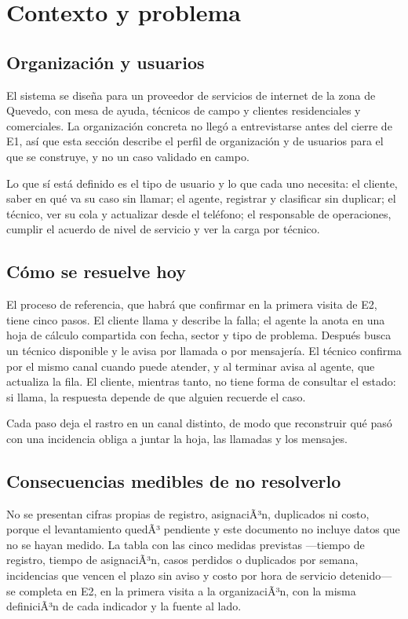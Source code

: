 \section{Contexto y problema}

\subsection{Organización y usuarios}

El sistema se diseña para un proveedor de servicios de internet de la zona de Quevedo, con mesa de
ayuda, técnicos de campo y clientes residenciales y comerciales. La organización concreta no llegó a
entrevistarse antes del cierre de E1, así que esta sección describe el perfil de organización y de
usuarios para el que se construye, y no un caso validado en campo.

Lo que sí está definido es el tipo de usuario y lo que cada uno necesita: el cliente, saber en qué va
su caso sin llamar; el agente, registrar y clasificar sin duplicar; el técnico, ver su cola y
actualizar desde el teléfono; el responsable de operaciones, cumplir el acuerdo de nivel de servicio y
ver la carga por técnico.

\subsection{Cómo se resuelve hoy}

El proceso de referencia, que habrá que confirmar en la primera visita de E2, tiene cinco pasos. El
cliente llama y describe la falla; el agente la anota en una hoja de cálculo compartida con fecha,
sector y tipo de problema. Después busca un técnico disponible y le avisa por llamada o por
mensajería. El técnico confirma por el mismo canal cuando puede atender, y al terminar avisa al
agente, que actualiza la fila. El cliente, mientras tanto, no tiene forma de consultar el estado: si
llama, la respuesta depende de que alguien recuerde el caso.

Cada paso deja el rastro en un canal distinto, de modo que reconstruir qué pasó con una incidencia
obliga a juntar la hoja, las llamadas y los mensajes.

\subsection{Consecuencias medibles de no resolverlo}

No se presentan cifras propias de registro, asignaciÃ³n, duplicados ni costo, porque el levantamiento
quedÃ³ pendiente y este documento no incluye datos que no se hayan medido. La tabla con las cinco
medidas previstas ---tiempo de registro, tiempo de asignaciÃ³n, casos perdidos o duplicados por semana,
incidencias que vencen el plazo sin aviso y costo por hora de servicio detenido--- se completa en E2,
en la primera visita a la organizaciÃ³n, con la misma definiciÃ³n de cada indicador y la fuente al lado.

